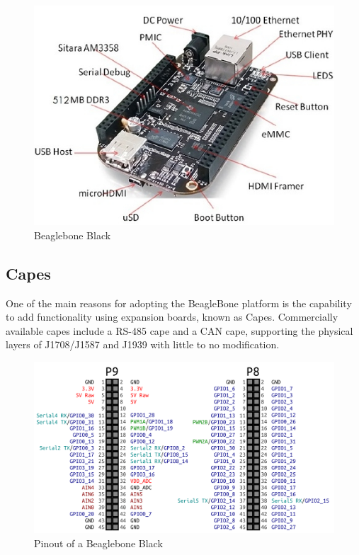 \begin{figure}[h]
  \centering
  \includegraphics{BeagleBoneBlack}
  \caption{Beaglebone Black}
  \label{fig:BBB}
\end{figure}

\subsection{Capes}

One of the main reasons for adopting the BeagleBone platform is the capability to add functionality using expansion boards, known
as Capes. Commercially available capes include a RS-485 cape and a CAN cape, supporting the physical layers of J1708/J1587 and J1939
with little to no modification.


\begin{figure}[h]
  \centering
  \includegraphics{BeaglebonePinout}
  \caption{Pinout of a Beaglebone Black}
  \label{fig:BBB-pinout}
\end{figure}

